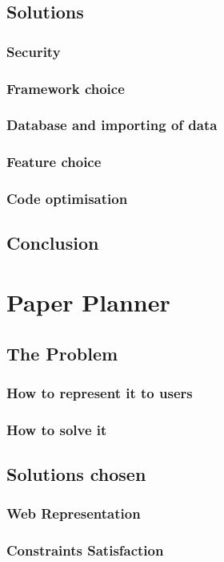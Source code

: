 \documentclass[12pt]{article}
\begin{document}
\subsection{Solutions}
\subsubsection{Security}
\subsubsection{Framework choice}
\subsubsection{Database and importing of data}
\subsubsection{Feature choice}
\subsubsection{Code optimisation}
\subsection{Conclusion}

\section{Paper Planner}
\subsection{The Problem}
\subsubsection{How to represent it to users}
\subsubsection{How to solve it}
\subsection{Solutions chosen}
\subsubsection{Web Representation}
\subsubsection{Constraints Satisfaction}
\end{document}
